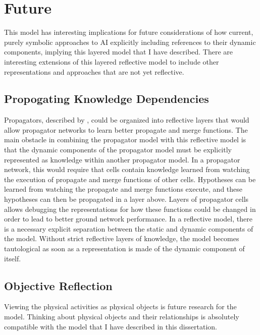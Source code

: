 \chapter{Future}\label{chapter:future}

This model has interesting implications for future considerations of
how current, purely symbolic approaches to AI explicitly including
references to their dynamic components, implying this layered model
that I have described.  There are interesting extensions of this
layered reflective model to include other representations and
approaches that are not yet reflective.

\section{Propogating Knowledge Dependencies}

Propagators, described by \cite{radul_and_sussman:2009}, could be
organized into reflective layers that would allow propagator networks
to learn better propagate and merge functions.  The main obstacle in
combining the propagator model with this reflective model is that the
dynamic components of the propagator model must be explicitly
represented as knowledge within another propagator model.  In a
propagator network, this would require that cells contain knowledge
learned from watching the execution of propagate and merge functions
of other cells.  Hypotheses can be learned from watching the propagate
and merge functions execute, and these hypotheses can then be
propagated in a layer above.  Layers of propagator cells allows
debugging the representations for how these functions could be changed
in order to lead to better ground network performance.  In a
reflective model, there is a necessary explicit separation between the
static and dynamic components of the model.  Without strict reflective
layers of knowledge, the model becomes tautological as soon as a
representation is made of the dynamic component of itself.

\section{Objective Reflection}
\label{section:objective_reflection}

Viewing the physical activities as physical objects is future research
for the model.  Thinking about physical objects and their
relationships is absolutely compatible with the model that I have
described in this dissertation.

